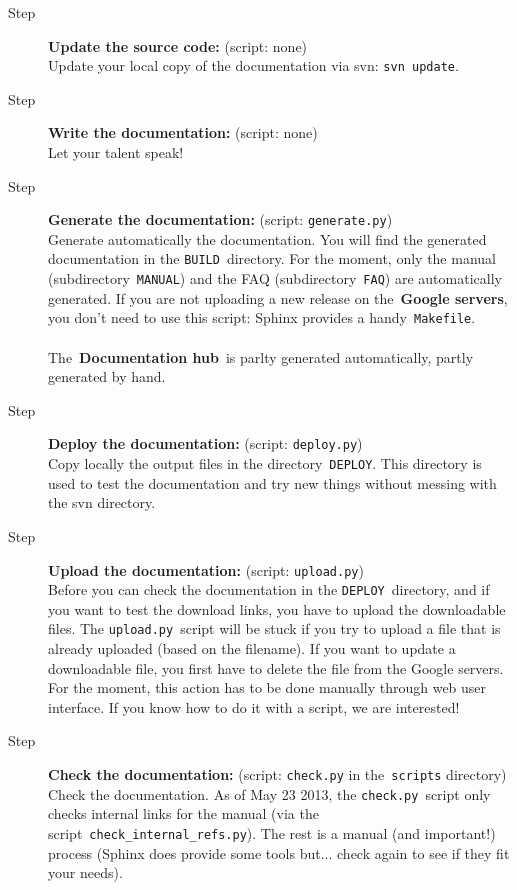\documentclass[a4paper,10pt]{article}
\newcommand{\code}[1]{\texttt{#1}}
\newcommand{\gservers}{{\bf Google servers}}
\newcommand{\dhub}{{\bf Documentation hub}}
\begin{document}
\begin{description}
 \item[Step ] {\bf Update the source code:} (script: none)\\Update your local copy of the documentation via svn: \code{svn update}.
 \item[Step ] {\bf Write the documentation:} (script: none)\\Let your talent speak!

 \item[Step ] {\bf Generate the documentation:} (script: \code{generate.py})\\Generate automatically the documentation. You will find the generated documentation
in the \code{BUILD}~directory. For the moment, only the manual (subdirectory~\code{MANUAL}) and the FAQ (subdirectory~\code{FAQ}) are automatically generated. If you are not uploading a new release on the~\gservers, you 
don't need to use this script: Sphinx provides a handy~\code{Makefile}.\\~\\
The~\dhub\ is parlty generated automatically, partly generated by hand.

 \item[Step ] {\bf Deploy the documentation:} (script: \code{deploy.py})\\Copy locally the output files in the directory~\code{DEPLOY}. This directory is used to test
the documentation and try new things without messing with the svn directory.

\item[Step ] {\bf Upload the documentation:} (script: \code{upload.py})\\Before you can check the documentation in the \code{DEPLOY}~directory, and if you want to test the download links, you have to upload the downloadable files. The \code{upload.py}~script will be stuck if you try to upload a file that is already uploaded (based on the filename). If you want to update a downloadable file, you first have to delete the file from the Google servers. For the moment, this action has to be done manually through web user interface. If you know how to do it with a script, we are interested!

 \item[Step ] {\bf Check the documentation:} (script: \code{check.py} in the~\code{scripts} directory)\\Check the documentation. As of May 23 2013, the \code{check.py}~script only checks internal links for the manual (via the script~\code{check\_internal\_refs.py}). The rest is a manual (and important!) process 
(Sphinx does provide some tools but... check again to see if they fit your needs).


\end{description}
\end{document}
